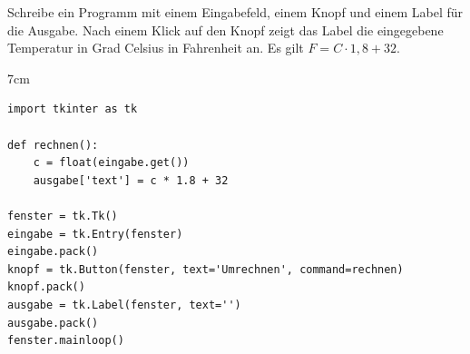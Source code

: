 \question[5]
Schreibe ein Programm mit einem Eingabefeld, einem Knopf und einem Label für die Ausgabe. Nach einem Klick auf den Knopf zeigt das Label die eingegebene
Temperatur in Grad Celsius in Fahrenheit an. Es gilt $F = C \cdot 1{,}8 + 32$.
\begin{solutionbox}{7cm}
\begin{lstlisting}
import tkinter as tk

def rechnen():
    c = float(eingabe.get())
    ausgabe['text'] = c * 1.8 + 32

fenster = tk.Tk()
eingabe = tk.Entry(fenster)
eingabe.pack()
knopf = tk.Button(fenster, text='Umrechnen', command=rechnen)
knopf.pack()
ausgabe = tk.Label(fenster, text='')
ausgabe.pack()
fenster.mainloop()
\end{lstlisting}
\end{solutionbox}
